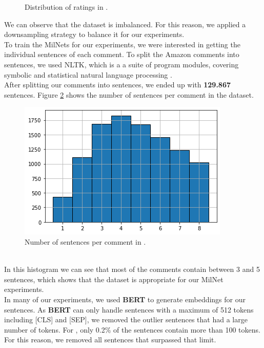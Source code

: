 \begin{figure}[h]
\centering
{}
\caption{Distribution of ratings in \dataEN.}
\label{amazon_en_pie_chart}
\end{figure}
We can observe that the dataset is imbalanced. For this reason, we applied a downsampling strategy to balance it for our experiments.\\
To train the MilNets for our experiments, we were interested in getting the individual sentences of each comment. To split the Amazon comments into sentences, we used NLTK, which is a a suite of program modules, covering symbolic and statistical natural language processing \cite{NLTKarticle}.\\
After splitting our comments into sentences, we ended up with {\bf 129.867} sentences. Figure \ref{sentences_per_comment_amazon_en} shows the number of sentences per comment in the dataset.
\begin{figure}[h]
\centerline{\includegraphics[scale=.4]{images/sentences_per_comment_amazon_en.png}}
\caption{Number of sentences per comment in \dataEN.}
\label{sentences_per_comment_amazon_en}
\end{figure}\\
In this histogram we can see that most of the comments contain between 3 and 5 sentences, which shows that the dataset is appropriate for our MilNet experiments.\\
In many of our experiments, we used {\bf BERT} to generate embeddings for our sentences. As {\bf BERT} can only handle sentences with a maximum of 512 tokens including [CLS] and [SEP], we removed the outlier sentences that had a large number of tokens. For \dataEN, only 0.2\% of the sentences contain more than 100 tokens. For this reason, we removed all sentences that surpassed that limit.\\
